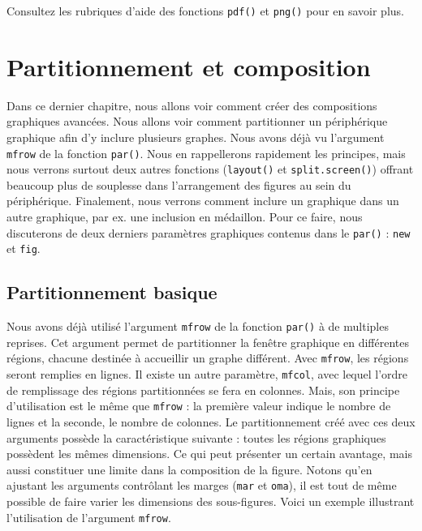 \documentclass[]{article}
\begin{document}
Consultez les rubriques d'aide des fonctions \texttt{pdf()} et \texttt{png()} pour en savoir plus.

\hypertarget{partitionnement-et-composition}{%
\section{Partitionnement et composition}\label{partitionnement-et-composition}}

Dans ce dernier chapitre, nous allons voir comment créer des compositions
graphiques avancées. Nous allons voir comment partitionner un périphérique
graphique afin d'y inclure plusieurs graphes. Nous avons déjà vu l'argument
\texttt{mfrow} de la fonction \texttt{par()}. Nous en rappellerons rapidement les principes,
mais nous verrons surtout deux autres fonctions (\texttt{layout()} et \texttt{split.screen()})
offrant beaucoup plus de souplesse dans l'arrangement des figures au sein du
périphérique. Finalement, nous verrons comment inclure un graphique dans un
autre graphique, par ex. une inclusion en médaillon. Pour ce faire, nous
discuterons de deux derniers paramètres graphiques contenus dans le \texttt{par()} :
\texttt{new} et \texttt{fig}.

\hypertarget{partitionnement-basique}{%
\subsection{Partitionnement basique}\label{partitionnement-basique}}

Nous avons déjà utilisé l'argument \texttt{mfrow} de la fonction \texttt{par()} à de multiples reprises. Cet argument permet de partitionner la fenêtre graphique en différentes régions, chacune destinée à accueillir un graphe différent. Avec \texttt{mfrow}, les régions seront remplies en lignes. Il existe un autre paramètre, \texttt{mfcol}, avec lequel l'ordre de remplissage des régions partitionnées se fera en colonnes. Mais, son principe d'utilisation est le même que \texttt{mfrow} : la première valeur indique le nombre de lignes et la seconde, le nombre de colonnes.
Le partitionnement créé avec ces deux arguments possède la caractéristique suivante : toutes les régions graphiques possèdent les mêmes dimensions. Ce qui peut présenter un certain avantage, mais aussi constituer une limite dans la composition de la figure. Notons qu'en ajustant les arguments contrôlant les marges (\texttt{mar} et \texttt{oma}), il est tout de même possible de faire varier les dimensions des sous-figures.
Voici un exemple illustrant l'utilisation de l'argument \texttt{mfrow}.
\end{document}
